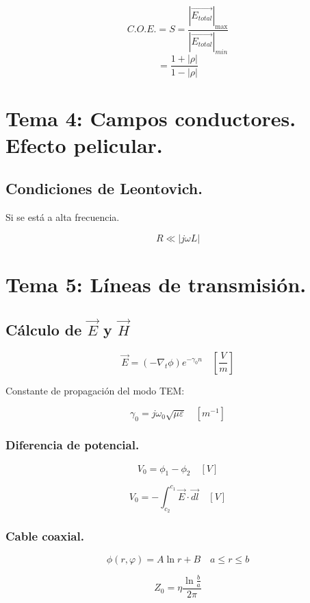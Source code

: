 \documentclass[12pt,a4paper]{article}
\begin{document}
\[ C.O.E. = S = \frac{\left| \vec{E_{total}} \right|_{\max}}{\left|
\vec{E_{total}} \right|_{min}} \]
\[ = \frac{1+|\rho|}{1-|\rho|}  \]

\section{Tema 4: Campos conductores. Efecto pelicular.}

\subsection{Condiciones de Leontovich.}
\label{sub:condiciones_de_leontovich}

Si se está a alta frecuencia.

\[ R \ll |j \omega  L| \]

\section{Tema 5: Líneas de transmisión.}
\label{sec:lineas_de_transmision}

\subsection{Cálculo de $ \vec{E} $ y $ \vec{H} $}
\label{sub:calculo_de_E_y_H}

\[ \vec{E} = (- \nabla_t \phi) e^{- \gamma_0 n} \quad \left[ \frac{V}{m} \right] \]

Constante de propagación del modo TEM:

\[ \gamma_0 = j \omega_0 \sqrt{\mu \varepsilon} \quad [m^{-1}] \]

\subsubsection{Diferencia de potencial.}
\label{ssub:diferencia_de_potencial}

\[ V_0 = \phi_1 - \phi_2 \quad [V] \]

\[V_0 = - \int_{c_{2}}^{c_{1}} \vec{E} \cdot \vec{dl} \quad [V] \]

\subsubsection{Cable coaxial.}
\label{ssub:cable_coaxial}

\[ \phi (r,\varphi) = A \ln{r} +B \quad a \leq r \leq b \]

\[ Z_0 = \eta \frac{\ln{\frac{b}{a}}}{2\pi} \]
\end{document}
